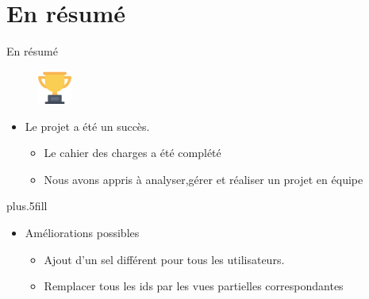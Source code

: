 \section*{En résumé}

\begin{frame}{En résumé}
\begin{figure}[h!]
  \includegraphics[width=0.10\textwidth]{images/Winner_1-512}
\end{figure}
  \begin{itemize}
  \item
    Le projet a été un succès.
 \begin{itemize}
  \item
    Le cahier des charges a été complété
  \item
    Nous avons appris à analyser,gérer et réaliser un projet en équipe
 \end{itemize}
  \end{itemize}
  
  \vskip0pt plus.5fill
  \begin{itemize}
  \item
    Améliorations possibles
    \begin{itemize}
    \item
      Ajout d'un sel différent pour tous les utilisateurs.
    \item
      Remplacer tous les ids par les vues partielles correspondantes
    \end{itemize}
  \end{itemize}
\end{frame}